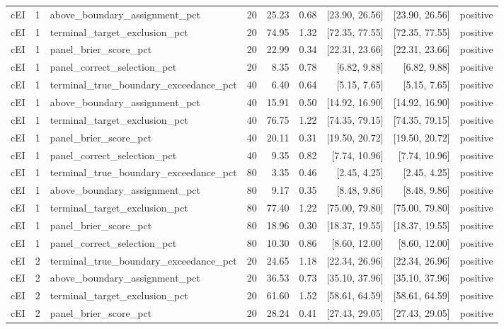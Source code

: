 \begin{longtable}{lllrrrrrl}
cEI & 1 & above\_boundary\_assignment\_pct & 20 & 25.23 & 0.68 & [23.90, 26.56] & [23.90, 26.56] & positive \\
cEI & 1 & terminal\_target\_exclusion\_pct & 20 & 74.95 & 1.32 & [72.35, 77.55] & [72.35, 77.55] & positive \\
cEI & 1 & panel\_brier\_score\_pct & 20 & 22.99 & 0.34 & [22.31, 23.66] & [22.31, 23.66] & positive \\
cEI & 1 & panel\_correct\_selection\_pct & 20 & 8.35 & 0.78 & [6.82, 9.88] & [6.82, 9.88] & positive \\
cEI & 1 & terminal\_true\_boundary\_exceedance\_pct & 40 & 6.40 & 0.64 & [5.15, 7.65] & [5.15, 7.65] & positive \\
cEI & 1 & above\_boundary\_assignment\_pct & 40 & 15.91 & 0.50 & [14.92, 16.90] & [14.92, 16.90] & positive \\
cEI & 1 & terminal\_target\_exclusion\_pct & 40 & 76.75 & 1.22 & [74.35, 79.15] & [74.35, 79.15] & positive \\
cEI & 1 & panel\_brier\_score\_pct & 40 & 20.11 & 0.31 & [19.50, 20.72] & [19.50, 20.72] & positive \\
cEI & 1 & panel\_correct\_selection\_pct & 40 & 9.35 & 0.82 & [7.74, 10.96] & [7.74, 10.96] & positive \\
cEI & 1 & terminal\_true\_boundary\_exceedance\_pct & 80 & 3.35 & 0.46 & [2.45, 4.25] & [2.45, 4.25] & positive \\
cEI & 1 & above\_boundary\_assignment\_pct & 80 & 9.17 & 0.35 & [8.48, 9.86] & [8.48, 9.86] & positive \\
cEI & 1 & terminal\_target\_exclusion\_pct & 80 & 77.40 & 1.22 & [75.00, 79.80] & [75.00, 79.80] & positive \\
cEI & 1 & panel\_brier\_score\_pct & 80 & 18.96 & 0.30 & [18.37, 19.55] & [18.37, 19.55] & positive \\
cEI & 1 & panel\_correct\_selection\_pct & 80 & 10.30 & 0.86 & [8.60, 12.00] & [8.60, 12.00] & positive \\
cEI & 2 & terminal\_true\_boundary\_exceedance\_pct & 20 & 24.65 & 1.18 & [22.34, 26.96] & [22.34, 26.96] & positive \\
cEI & 2 & above\_boundary\_assignment\_pct & 20 & 36.53 & 0.73 & [35.10, 37.96] & [35.10, 37.96] & positive \\
cEI & 2 & terminal\_target\_exclusion\_pct & 20 & 61.60 & 1.52 & [58.61, 64.59] & [58.61, 64.59] & positive \\
cEI & 2 & panel\_brier\_score\_pct & 20 & 28.24 & 0.41 & [27.43, 29.05] & [27.43, 29.05] & positive \\

\end{longtable}
